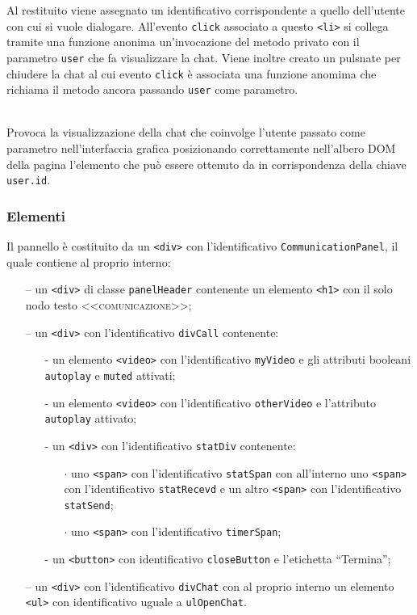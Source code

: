 \begin{description}
   Al  restituito viene assegnato un identificativo corrispondente a quello dell'utente con cui si vuole dialogare. All'evento \verb'click' associato a questo \verb'<li>' si collega tramite una funzione anonima un'invocazione del metodo privato  con il parametro \verb'user' che fa visualizzare la chat. Viene inoltre creato un pulsnate per chiudere la chat al cui evento \verb'click' è associata una funzione anomima che richiama il metodo  ancora passando \verb'user' come parametro.

  \item{}\\
  Provoca la visualizzazione della chat che coinvolge l'utente passato come parametro nell'interfaccia grafica posizionando correttamente nell'albero DOM della pagina l'elemento che può essere ottenuto da  in corrispondenza della chiave \verb'user.id'.

\end{description}

\subsubsection*{Elementi}
Il pannello è costituito da un \verb'<div>' con l'identificativo \verb'CommunicationPanel', il quale contiene al proprio interno:
\begin{itemize}
  \item[--] un \verb'<div>' di classe \verb'panelHeader' contenente un elemento \verb'<h1>' con il solo nodo testo \textsc{<<comunicazione>>};
  \item[--] un \verb'<div>' con l'identificativo \verb'divCall' contenente:
  \begin{itemize}
    \item[-] un elemento \verb'<video>' con l'identificativo \verb'myVideo' e gli attributi booleani \verb'autoplay' e \verb'muted' attivati;
    \item[-] un elemento \verb'<video>' con l'identificativo \verb'otherVideo' e l'attributo \verb'autoplay' attivato;
    \item[-] un \verb'<div>' con l'identificativo \verb'statDiv' contenente:
    \begin{itemize}
      \item[$\cdot$] uno \verb'<span>' con l'identificativo \verb'statSpan' con all'interno uno \verb'<span>' con l'identificativo \verb'statRecevd' e un altro \verb'<span>' con l'identificativo \verb'statSend';
      \item[$\cdot$] uno \verb'<span>' con l'identificativo \verb'timerSpan';
    \end{itemize}
    \item[-] un \verb'<button>' con identificativo \verb'closeButton' e l'etichetta ``Termina'';
  \end{itemize}
  \item[--] un \verb'<div>' con l'identificativo \verb'divChat' con al proprio interno un elemento \verb'<ul>' con identificativo uguale a \verb'ulOpenChat'. 
\end{itemize}


